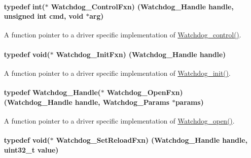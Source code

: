 \paragraph[{Watchdog\+\_\+\+Control\+Fxn}]{\setlength{\rightskip}{0pt plus 5cm}typedef int($\ast$ Watchdog\+\_\+\+Control\+Fxn) ({\bf Watchdog\+\_\+\+Handle} handle, unsigned int cmd, void $\ast$arg)}\label{_watchdog_8h_afb5bd0153345db8f4a7a6a8756b90447}


A function pointer to a driver specific implementation of \hyperlink{_watchdog_8h_aa98a75361edb1e476432669169f2950e}{Watchdog\+\_\+control()}. 

\paragraph[{Watchdog\+\_\+\+Init\+Fxn}]{\setlength{\rightskip}{0pt plus 5cm}typedef void($\ast$ Watchdog\+\_\+\+Init\+Fxn) ({\bf Watchdog\+\_\+\+Handle} handle)}\label{_watchdog_8h_a6401b1a23d9048efb4ed69a074ea60f9}


A function pointer to a driver specific implementation of \hyperlink{_watchdog_8h_afaadfb59be17661ae95562f2081355e7}{Watchdog\+\_\+init()}. 

\paragraph[{Watchdog\+\_\+\+Open\+Fxn}]{\setlength{\rightskip}{0pt plus 5cm}typedef {\bf Watchdog\+\_\+\+Handle}($\ast$ Watchdog\+\_\+\+Open\+Fxn) ({\bf Watchdog\+\_\+\+Handle} handle, {\bf Watchdog\+\_\+\+Params} $\ast$params)}\label{_watchdog_8h_a05ae778da809a34e4d84c95d35ba5f58}


A function pointer to a driver specific implementation of \hyperlink{_watchdog_8h_aa5ce656aa6d5199e1efdb4ca2cd9fb7c}{Watchdog\+\_\+open()}. 

\paragraph[{Watchdog\+\_\+\+Set\+Reload\+Fxn}]{\setlength{\rightskip}{0pt plus 5cm}typedef void($\ast$ Watchdog\+\_\+\+Set\+Reload\+Fxn) ({\bf Watchdog\+\_\+\+Handle} handle, uint32\+\_\+t value)}\label{_watchdog_8h_ab6ef6008c6bbc7d34b5638458e1ae5c1}


